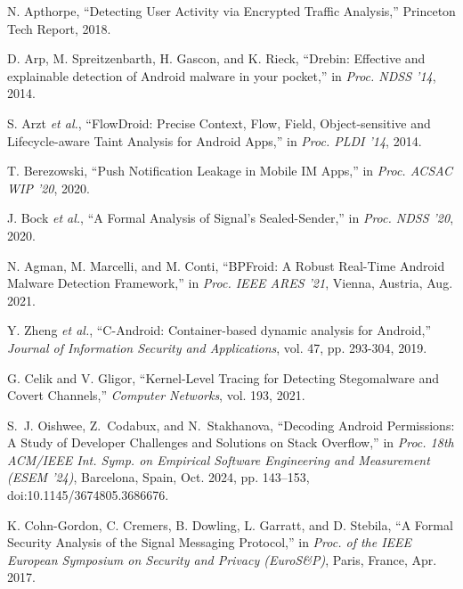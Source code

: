 \documentclass[a4paper,12pt]{report}
\begin{document}
\begin{thebibliography}{99}

N. Apthorpe, “Detecting User Activity via Encrypted Traffic Analysis,” Princeton Tech Report, 2018.

D. Arp, M. Spreitzenbarth, H. Gascon, and K. Rieck, “Drebin: Effective and explainable detection of Android malware in your pocket,” in \emph{Proc. NDSS '14}, 2014.

S. Arzt \emph{et al.}, “FlowDroid: Precise Context, Flow, Field, Object-sensitive and Lifecycle-aware Taint Analysis for Android Apps,” in \emph{Proc. PLDI '14}, 2014.

T. Berezowski, “Push Notification Leakage in Mobile IM Apps,” in \emph{Proc. ACSAC WIP '20}, 2020.

J. Bock \emph{et al.}, “A Formal Analysis of Signal’s Sealed-Sender,” in \emph{Proc. NDSS '20}, 2020.

N. Agman, M. Marcelli, and M. Conti, “BPFroid: A Robust Real-Time Android Malware Detection Framework,” in \emph{Proc. IEEE ARES ’21}, Vienna, Austria, Aug. 2021.

Y. Zheng \emph{et al.}, “C-Android: Container-based dynamic analysis for Android,” \emph{Journal of Information Security and Applications}, vol. 47, pp. 293-304, 2019.

G. Celik and V. Gligor, “Kernel-Level Tracing for Detecting Stegomalware and Covert Channels,” \emph{Computer Networks}, vol. 193, 2021.

S.~J. Oishwee, Z.~Codabux, and N.~Stakhanova, “Decoding Android Permissions: A Study of Developer Challenges and Solutions on Stack Overflow,” in \emph{Proc. 18th ACM/IEEE Int. Symp. on Empirical Software Engineering and Measurement (ESEM ’24)}, Barcelona, Spain, Oct. 2024, pp. 143–153, doi:10.1145/3674805.3686676.

K. Cohn-Gordon, C. Cremers, B. Dowling, L. Garratt, and D. Stebila, “A Formal Security Analysis of the Signal Messaging Protocol,” in \emph{Proc. of the IEEE European Symposium on Security and Privacy (EuroS\&P)}, Paris, France, Apr. 2017.


\end{thebibliography}
\end{document}
